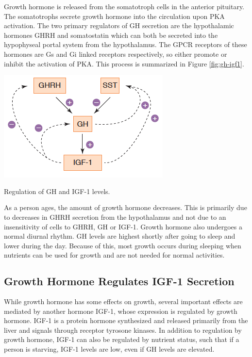 \documentclass{tufte-handout}
\begin{document}
Growth hormone is released from the somatotroph cells in the anterior pituitary.  The somatotrophs secrete growth hormone into the circulation upon PKA activation.  The two primary regulators of GH secretion are the hypothalamic hormones GHRH and somatostatin which can both be secreted into the hypophyseal portal system from the hypothalamus.  The GPCR receptors of these hormones are Gs and Gi linked receptors respectively, so either promote or inhibit the activation of PKA.  This process is summarized in Figure \ref{fig:gh-igf1}.


\begin{marginfigure}
  \includegraphics{figures/gh-igf1}
  \caption{Regulation of GH and IGF-1 levels.}
    \label{fig:gh-igf1}
\end{marginfigure}

  As a person ages, the amount of growth hormone decreases.  This is primarily due to decreases in GHRH secretion from the hypothalamus and not due to an insensitivity of cells to GHRH, GH or IGF-1.  Growth hormone also undergoes a normal diurnal rhythm.  GH levels are highest shortly after going to sleep and lower during the day.  Because of this, most growth occurs during sleeping when nutrients can be used for growth and are not needed for normal activities.

\subsection{Growth Hormone Regulates IGF-1 Secretion}

While growth hormone has some effects on growth, several important effects are mediated by another hormone IGF-1, whose expression is regulated by growth hormone.  IGF-1 is a protein hormone synthesized and released primarily from the liver and signals through receptor tyrosone kinases.  In addition to regulation by growth hormone, IGF-1 can also be regulated by nutrient status, such that if a person is starving, IGF-1 levels are low, even if GH levels are elevated.
\end{document}
